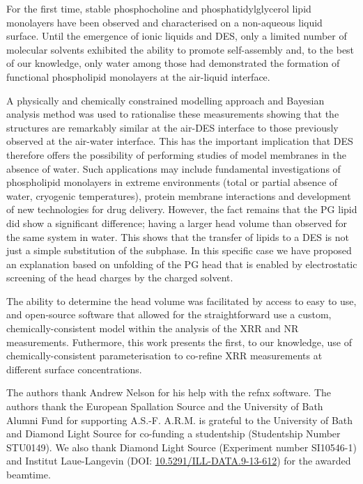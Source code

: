 \documentclass[twocolumn,a4paper]{paper}
\begin{document}
For the first time, stable phosphocholine and phosphatidylglycerol lipid monolayers have been observed and characterised on a non-aqueous liquid surface.
Until the emergence of ionic liquids and DES, only a limited number of molecular solvents exhibited the ability to promote self-assembly and, to the best of our knowledge, only water among those had demonstrated the formation of functional phospholipid monolayers at the air-liquid interface.

A physically and chemically constrained modelling approach and Bayesian analysis method was used to rationalise these measurements showing that the structures are remarkably similar at the air-DES interface to those previously observed at the air-water interface.
This has the important implication that DES therefore offers the possibility of performing studies of model membranes in the absence of water.
Such applications may include fundamental investigations of phospholipid monolayers in extreme environments (total or partial absence of water, cryogenic temperatures), protein membrane interactions and development of new technologies for drug delivery.
However, the fact remains that the PG lipid did show a significant difference; having a larger head volume than observed for the same system in water.
This shows that the transfer of lipids to a DES is not just a simple substitution of the subphase. In this specific case we have proposed an explanation based on unfolding of the PG head that is enabled by electrostatic screening of the head charges by the charged solvent.

The ability to determine the head volume was facilitated by access to easy to use, and open-source software that allowed for the straightforward use a custom, chemically-consistent model within the analysis of the XRR and NR measurements.
Futhermore, this work presents the first, to our knowledge, use of chemically-consistent parameterisation to co-refine XRR measurements at different surface concentrations.

The authors thank Andrew Nelson for his help with the refnx software.
The authors thank the European Spallation Source and the University of Bath Alumni Fund for supporting A.S.-F.
A.R.M. is grateful to the University of Bath and Diamond Light Source for co-funding a studentship (Studentship Number STU0149). 
We also thank Diamond Light Source (Experiment number SI10546-1) and Institut Laue-Langevin (DOI: \href{http://doi.org/10.5291/ILL-DATA.9-13-612}{10.5291/ILL-DATA.9-13-612}) for the awarded beamtime.

\setlength{\bibsep}{1pt}

\end{document}

